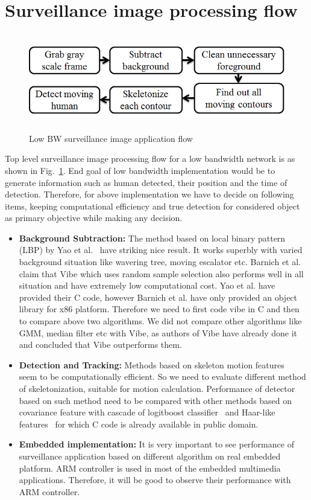 \section{Surveillance image processing flow}
\begin{figure}[!b]
\centering
\includegraphics[height=120pt]{Figures/image_pipeline}
\caption{Low BW surveillance image application flow}
\label{image_pipeline}
\end{figure}
\indent Top level surveillance image processing flow for a low bandwidth
network is as shown in Fig.~\ref{image_pipeline}. End goal of low
bandwidth implementation would be to generate information such as human
detected, their position and the time of detection. Therefore, for above
implementation we have to decide on following items, keeping
computational efficiency and true detection for considered object as
primary objective while making any decision.\\
\begin{itemize}
 \item \textbf{Background Subtraction:} The method based on local binary
 pattern (LBP) by Yao et al.~\cite{11} have striking nice result. It
 works superbly with
 varied background situation like wavering tree, moving escalator
 etc. Barnich et al.~\cite{9} claim that Vibe which uses random
 sample selection also performs well in all situation and have
 extremely low computational cost. Yao et al. have provided their
 C code, however Barnich et al. have only provided an object
 library for x86 platform. Therefore we need to first code vibe
 in C and then to compare above two algorithms. We did not
 compare other algorithms like GMM, median filter etc with Vibe,
 as authors of Vibe have already done it and concluded that Vibe
 outperforms them.
\item \textbf{Detection and Tracking:} Methods based on skeleton motion
 features~\cite{32, 22, 31} seem to be computationally
 efficient. So we need to evaluate different method of
 skeletonization, suitable for motion calculation. Performance of
 detector based on such method need to be compared with other
 methods based on covariance feature with cascade of logitboost
 classifier~\cite{19} and Haar-like features~\cite{17} for
 which C code is already available in public domain.
\item \textbf{Embedded implementation:} It is very important to see
 performance of surveillance application based on different
 algorithm on real embedded platform. ARM controller is used in
 most of the embedded multimedia applications. Therefore, it will be
 good to observe their performance with ARM controller.
\end{itemize}
